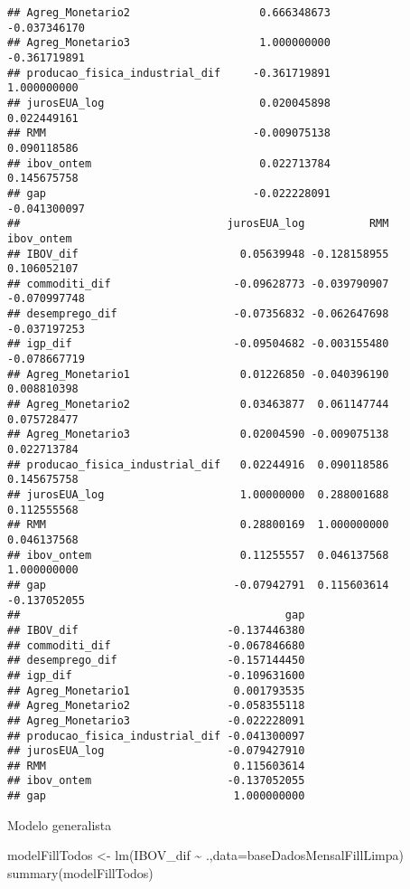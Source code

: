 \documentclass[
]{article}
\newenvironment{Shaded}{\begin{snugshade}}{\end{snugshade}}
\newcommand{\AttributeTok}[1]{\textcolor[rgb]{0.77,0.63,0.00}{#1}}
\newcommand{\FunctionTok}[1]{\textcolor[rgb]{0.00,0.00,0.00}{#1}}
\newcommand{\NormalTok}[1]{#1}
\newcommand{\OtherTok}[1]{\textcolor[rgb]{0.56,0.35,0.01}{#1}}
\newcommand{\SpecialCharTok}[1]{\textcolor[rgb]{0.00,0.00,0.00}{#1}}
\begin{document}
\begin{verbatim}
## Agreg_Monetario2                    0.666348673                   -0.037346170
## Agreg_Monetario3                    1.000000000                   -0.361719891
## producao_fisica_industrial_dif     -0.361719891                    1.000000000
## jurosEUA_log                        0.020045898                    0.022449161
## RMM                                -0.009075138                    0.090118586
## ibov_ontem                          0.022713784                    0.145675758
## gap                                -0.022228091                   -0.041300097
##                                jurosEUA_log          RMM   ibov_ontem
## IBOV_dif                         0.05639948 -0.128158955  0.106052107
## commoditi_dif                   -0.09628773 -0.039790907 -0.070997748
## desemprego_dif                  -0.07356832 -0.062647698 -0.037197253
## igp_dif                         -0.09504682 -0.003155480 -0.078667719
## Agreg_Monetario1                 0.01226850 -0.040396190  0.008810398
## Agreg_Monetario2                 0.03463877  0.061147744  0.075728477
## Agreg_Monetario3                 0.02004590 -0.009075138  0.022713784
## producao_fisica_industrial_dif   0.02244916  0.090118586  0.145675758
## jurosEUA_log                     1.00000000  0.288001688  0.112555568
## RMM                              0.28800169  1.000000000  0.046137568
## ibov_ontem                       0.11255557  0.046137568  1.000000000
## gap                             -0.07942791  0.115603614 -0.137052055
##                                         gap
## IBOV_dif                       -0.137446380
## commoditi_dif                  -0.067846680
## desemprego_dif                 -0.157144450
## igp_dif                        -0.109631600
## Agreg_Monetario1                0.001793535
## Agreg_Monetario2               -0.058355118
## Agreg_Monetario3               -0.022228091
## producao_fisica_industrial_dif -0.041300097
## jurosEUA_log                   -0.079427910
## RMM                             0.115603614
## ibov_ontem                     -0.137052055
## gap                             1.000000000
\end{verbatim}

Modelo generalista

\begin{Shaded}
\begin{Highlighting}[]
\NormalTok{modelFillTodos }\OtherTok{\textless{}{-}} \FunctionTok{lm}\NormalTok{(IBOV\_dif }\SpecialCharTok{\textasciitilde{}}\NormalTok{ .,}\AttributeTok{data=}\NormalTok{baseDadosMensalFillLimpa)}
\FunctionTok{summary}\NormalTok{(modelFillTodos)}
\end{Highlighting}
\end{Shaded}
\end{document}
